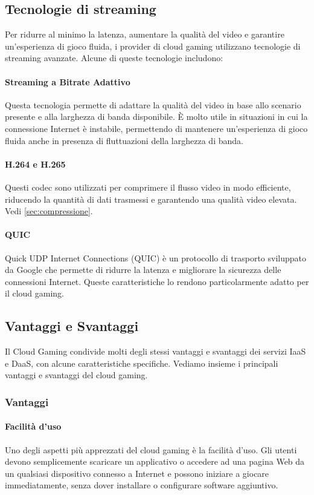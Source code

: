 \documentclass[12pt,a4paper,openright,twoside]{book}
\begin{document}
\subsection{Tecnologie di streaming}
\label{subsec:streaming-tech}
Per ridurre al minimo la latenza, aumentare la qualità del video e garantire un'esperienza di gioco fluida, i provider di cloud gaming utilizzano tecnologie di streaming avanzate.
Alcune di queste tecnologie includono:

\paragraph{Streaming a Bitrate Adattivo} Questa tecnologia permette di adattare la qualità del video in base allo scenario presente e alla larghezza di banda disponibile. È molto utile in situazioni in cui la connessione Internet è instabile, permettendo di mantenere un'esperienza di gioco fluida anche in presenza di fluttuazioni della larghezza di banda.

\paragraph{H.264 e H.265} Questi codec sono utilizzati per comprimere il flusso video in modo efficiente, riducendo la quantità di dati trasmessi e garantendo una qualità video elevata. Vedi \ref{sec:compressione}.

\paragraph{QUIC} Quick UDP Internet Connections (QUIC) è un protocollo di trasporto sviluppato da Google che permette di ridurre la latenza e migliorare la sicurezza delle connessioni Internet. Queste caratteristiche lo rendono particolarmente adatto per il cloud gaming.

\subsection{Vantaggi e Svantaggi}
Il Cloud Gaming condivide molti degli stessi vantaggi e svantaggi dei servizi IaaS e DaaS, con alcune caratteristiche specifiche. Vediamo insieme i principali vantaggi e svantaggi del cloud gaming.

\subsubsection{Vantaggi}
\paragraph{Facilità d'uso} Uno degli aspetti più apprezzati del cloud gaming è la facilità d'uso. Gli utenti devono semplicemente scaricare un applicativo o accedere ad una pagina Web da un qualsiasi dispositivo connesso a Internet e possono iniziare a giocare immediatamente, senza dover installare o configurare software aggiuntivo.
\end{document}
